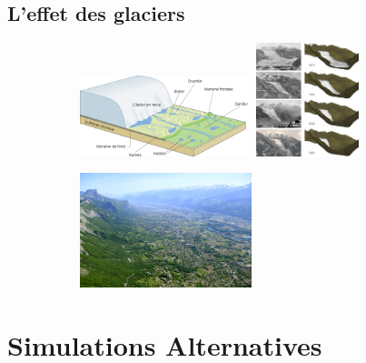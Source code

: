 \documentclass{beamer}
\begin{document}
\subsection{L'effet des glaciers}
\begin{frame}
	\begin{center}
		\begin{figure}
		\begin{figure}
			\includegraphics[width=5cm]{Images/Images_Alexis/glacier_reculon.png}
			\includegraphics[width=3cm]{Images/Images_Alexis/glaciers_img3.png}
		\end{figure}
		\caption{Les ères glaciaires successives ont grandement participé au façonnage de nos paysages.}
		\begin{figure}
			\includegraphics[width=5cm]{Images/Images_Alexis/gresivaudan.jpg}
		\end{figure}
		\end{figure}
	\end{center}
\end{frame}


\section{Simulations Alternatives}
\end{document}
